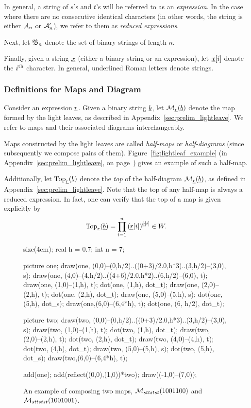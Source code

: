 In general, a string of $s$'s and $t$'s will be referred to as an \emph{expression}.  In the case where there are no consecutive identical characters (in other words, the string is either $\AA_n$ or $\AA_n'$), we refer to them as \emph{reduced expressions}.

Next, let $\BB_n$ denote the set of binary strings of length $n$.

Finally, given a string $\ul x$ (either a binary string or an expression), let $\ul x[i]$ denote the $i\th$ character.  In general, underlined Roman letters denote strings.

\subsubsection{Definitions for Maps and Diagram}
Consider an expression $\ul r$.  Given a binary string $\ul b$, let $\MM_{\ul r}(\ul b)$ denote the map formed by the light leaves, as described in Appendix~\ref{sec:prelim_lightleave}.  We refer to maps and their associated diagrams interchangeably.

Maps constructed by the light leaves are called \emph{half-maps} or \emph{half-diagrams} (since subsequently we compose pairs of them).  Figure~\ref{fig:lightleaf_example} (in Appendix~\ref{sec:prelim_lightleave}, on page~\pageref{sec:prelim_lightleave}) gives an example of such a half-map.

Additionally, let $\Top_{\ul r}(\ul b)$ denote the \emph{top} of the half-diagram $\MM_{\ul r}(\ul b)$, as defined in Appendix~\ref{sec:prelim_lightleave}.  
Note that the top of any half-map is always a reduced expression.  In fact, one can verify that the top of a map is given explicitly by
\begin{equation}
	\Top_{\ul r}(\ul b) = \prod_{i=1}^n \left( \ul r[i] \right)^{\ul b[i]} \in W.
	\label{eq:top}
\end{equation}

\begin{figure}[ht]
	\centering
	\begin{asy}
	size(4cm);
	real h = 0.7;
	int n = 7;

	picture one;
	draw(one, (0,0)--(0,h/2)..((0+3)/2.0,h*3)..(3,h/2)--(3,0), s);
	draw(one, (4,0)--(4,h/2)..((4+6)/2.0,h*2)..(6,h/2)--(6,0), t);
	draw(one, (1,0)--(1,h), t);
	dot(one, (1,h), dot_t);
	draw(one, (2,0)--(2,h), t);
	dot(one, (2,h), dot_t);
	draw(one, (5,0)--(5,h), s);
	dot(one, (5,h), dot_s);
	draw(one,(6,0)--(6,4*h), t);
	dot(one, (6, h/2), dot_t);

	picture two;
	draw(two, (0,0)--(0,h/2)..((0+3)/2.0,h*3)..(3,h/2)--(3,0), s);
	draw(two, (1,0)--(1,h), t);
	dot(two, (1,h), dot_t);
	draw(two, (2,0)--(2,h), t);
	dot(two, (2,h), dot_t);
	draw(two, (4,0)--(4,h), t);
	dot(two, (4,h), dot_t);
	draw(two, (5,0)--(5,h), s);
	dot(two, (5,h), dot_s);
	draw(two,(6,0)--(6,4*h), t);

	add(one); add(reflect((0,0),(1,0))*two);
	draw((-1,0)--(7,0));
	\end{asy}
	\caption{An example of composing two maps, $\MM_{sttstst}(1001100)$ and $\MM_{sttstst}(1001001)$.}
	\label{fig:example_compose}
\end{figure}

